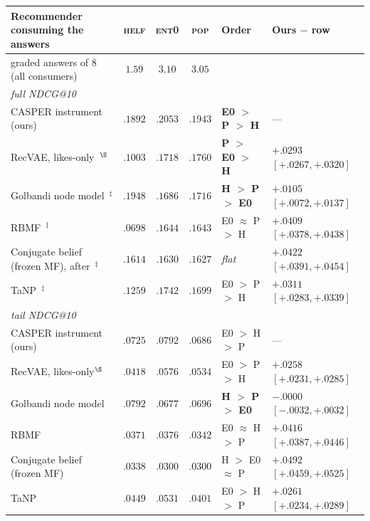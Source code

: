 \documentclass[manuscript,screen,review]{acmart}
\begin{document}
\begin{table}[t]\centering\scriptsize
\setlength{\tabcolsep}{4pt}
\renewcommand{\arraystretch}{1.18}
\begin{tabular}{p{3.6cm}ccc l l}
\toprule
Recommender consuming the answers & \textsc{helf} & \textsc{ent0} & \textsc{pop} &
  Order & Ours $-$ row \\
\midrule
graded answers of 8 (all consumers) & $1.59$ & $3.10$ & $3.05$ & & \\
\midrule
\multicolumn{6}{l}{\emph{full NDCG@10}}\\
CASPER instrument (ours) & $.1892$ & $\mathbf{.2053}$ & $.1943$ & \textbf{E0 $>$ P $>$ H} & --- \\
RecVAE, likes-only~\citep{ren2020recvae}$^{\S}$ & $.1003$ & $.1718$ & $\mathbf{.1760}$ & \textbf{P $>$ E0 $>$ H} & $+.0293$ $[+.0267,+.0320]$ \\
Golbandi node model~\citep{golbandi2011adaptive}$^{\ddagger}$ & $\mathbf{.1948}$ & $.1686$ & $.1716$ & \textbf{H $>$ P $>$ E0} & $+.0105$ $[+.0072,+.0137]$ \\
RBMF~\citep{liu2011wisdom,zhou2011functional}$^{\ddagger}$ & $.0698$ & $.1644$ & $.1643$ & E0 $\approx$ P $>$ H & $+.0409$ $[+.0378,+.0438]$ \\
Conjugate belief (frozen MF), after~\citet{biyik2023soft}$^{\ddagger}$ & $.1614$ & $.1630$ & $.1627$ & \emph{flat} & $+.0422$ $[+.0391,+.0454]$ \\
TaNP~\citep{lin2021tanp}$^{\ddagger}$ & $.1259$ & $\mathbf{.1742}$ & $.1699$ & E0 $>$ P $>$ H & $+.0311$ $[+.0283,+.0339]$ \\
\midrule
\multicolumn{6}{l}{\emph{tail NDCG@10}}\\
CASPER instrument (ours) & $.0725$ & $\mathbf{.0792}$ & $.0686$ & E0 $>$ H $>$ P & --- \\
RecVAE, likes-only$^{\S}$ & $.0418$ & $\mathbf{.0576}$ & $.0534$ & E0 $>$ P $>$ H & $+.0258$ $[+.0231,+.0285]$ \\
Golbandi node model & $\mathbf{.0792}$ & $.0677$ & $.0696$ & \textbf{H $>$ P $>$ E0} & $-.0000$ $[-.0032,+.0032]$ \\
RBMF & $.0371$ & $\mathbf{.0376}$ & $.0342$ & E0 $\approx$ H $>$ P & $+.0416$ $[+.0387,+.0446]$ \\
Conjugate belief (frozen MF) & $\mathbf{.0338}$ & $.0300$ & $.0300$ & H $>$ E0 $\approx$ P & $+.0492$ $[+.0459,+.0525]$ \\
TaNP & $.0449$ & $\mathbf{.0531}$ & $.0401$ & E0 $>$ H $>$ P & $+.0261$ $[+.0234,+.0289]$ \\

\end{tabular}
\end{table}
\end{document}
